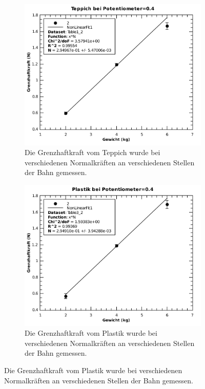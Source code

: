\begin{figure}[H]
    \centering
    \begin{subfigure}{.7\textwidth}
        \includegraphics[width=\linewidth]{images/teppich_haft_poti=0_4}
        \caption{Die Grenzhaftkraft vom Teppich wurde bei verschiedenen Normalkr\"aften an verschiedenen Stellen der Bahn gemessen.}
        \label{fig:teppich_haft_poti=0.4}
    \end{subfigure}
    \begin{subfigure}{.7\textwidth}
        \includegraphics[width=\linewidth]{images/plastik_haft_poti=0_4}
        \caption{Die Grenzhaftkraft vom Plastik wurde bei verschiedenen Normalkr\"aften an verschiedenen Stellen der Bahn gemessen.}
        \label{fig:plastik_haft_poti=0.4}
    \end{subfigure}
\end{figure}

